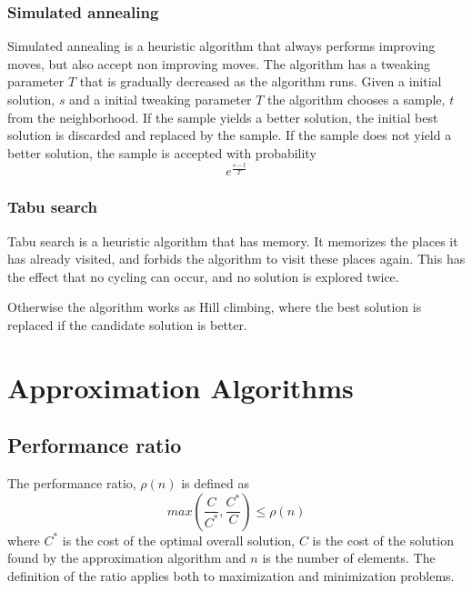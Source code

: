 \documentclass[10pt]{article}
\begin{document}

\subsubsection{Simulated annealing} %
\label{ssub:simulated_annuealing}
Simulated annealing is a heuristic algorithm that always performs improving moves, but also accept non improving moves. The algorithm has a tweaking parameter $T$ that is gradually decreased as the algorithm runs. Given a initial solution, $s$ and a initial tweaking parameter $T$ the algorithm chooses a sample, $t$ from the neighborhood. If the sample yields a better solution, the initial best solution is discarded and replaced by the sample. If the sample does not yield a better solution, the sample is accepted with probability
\begin{equation}
  e^{\frac{s-t}{T}}
\end{equation}


\subsubsection{Tabu search} %
\label{ssub:tabu_search}
Tabu search is a heuristic algorithm that has memory. It memorizes the places it has already visited, and forbids the algorithm to visit these places again. This has the effect that no cycling can occur, and no solution is explored twice. 

Otherwise the algorithm works as Hill climbing, where the best solution is replaced if the candidate solution is better.


\clearpage \newpage
\section{Approximation Algorithms} %
\label{sec:approximation_algorithms}


\subsection{Performance ratio} %
\label{sub:performance_ratio}
The performance ratio, $\rho(n)$ is defined as
\begin{equation}
  max(\frac{C}{C^*}, \frac{C^*}{C}) \label{eqapprox0} \leq \rho(n)
\end{equation}
where $C^*$ is the cost of the optimal overall solution, $C$ is the cost of the solution found by the approximation algorithm and $n$ is the number of elements. The definition of the ratio applies both to maximization and minimization problems. 
\end{document}
